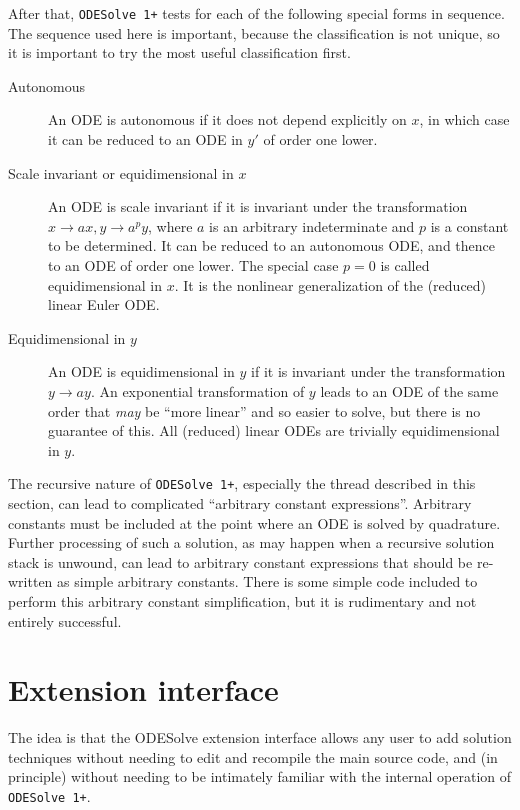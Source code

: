 \documentclass[a4paper]{article} %
\newcommand{\ODESolve}[1]{\texttt{ODESolve\,#1}}
\begin{document}
After that, \ODESolve{1+} tests for each of the following special
forms in sequence.  The sequence used here is important, because the
classification is not unique, so it is important to try the most
useful classification first.
\begin{description}
\item[Autonomous] An ODE is autonomous if it does not depend
explicitly on $x$, in which case it can be reduced to an ODE in $y'$
of order one lower.

\item[Scale invariant or equidimensional in $x$] An ODE is scale
invariant if it is invariant under the transformation $x \to ax, y \to
a^py$, where $a$ is an arbitrary indeterminate and $p$ is a constant
to be determined.  It can be reduced to an autonomous ODE, and thence
to an ODE of order one lower.  The special case $p = 0$ is called
equidimensional in $x$.  It is the nonlinear generalization of the
(reduced) linear Euler ODE.

\item[Equidimensional in $y$] An ODE is equidimensional in $y$ if it
is invariant under the transformation $y \to ay$.  An exponential
transformation of $y$ leads to an ODE of the same order that
\emph{may} be ``more linear'' and so easier to solve, but there is no
guarantee of this.  All (reduced) linear ODEs are trivially
equidimensional in $y$.
\end{description}

The recursive nature of \ODESolve{1+}, especially the thread described
in this section, can lead to complicated ``arbitrary constant
expressions''.  Arbitrary constants must be included at the point
where an ODE is solved by quadrature.  Further processing of such a
solution, as may happen when a recursive solution stack is unwound,
can lead to arbitrary constant expressions that should be re-written
as simple arbitrary constants.  There is some simple code included to
perform this arbitrary constant simplification, but it is rudimentary
and not entirely successful.


\section{Extension interface}\label{OEI}

The idea is that the ODESolve extension interface allows any user to
add solution techniques without needing to edit and recompile the main
source code, and (in principle) without needing to be intimately
familiar with the internal operation of \ODESolve{1+}.
\end{document}
